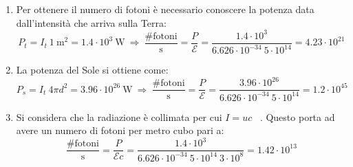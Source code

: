 \documentclass[12pt,twoside,a4]{article}
\begin{document}
\begin{solution}
\begin{enumerate}[label=(\textit{\roman*})]
	\item Per ottenere il numero di fotoni è necessario conoscere la potenza data dall'intensità che arriva sulla Terra: \begin{equation*}
    P_t = I_t \ 1 \ \mathrm{m}^2 = 1.4 \cdot 10^3 \ \mathrm{W}  \  \Rightarrow  \  \frac{\mathrm{\#fotoni}}{\mathrm{s}} = \frac{P}{\mathcal{E}} = \frac{1.4 \cdot 10^3}{6.626 \cdot 10^{-34} \ 5 \cdot 10^{14}} = 4.23 \cdot 10^{21} 
\end{equation*}

\item La potenza del Sole si ottiene come: \begin{equation*}
    P_s = I_t \ 4\pi d^2 = 3.96 \cdot 10^{26} \ \mathrm{W}  \  \Rightarrow  \  \frac{\mathrm{\#fotoni}}{\mathrm{s}} = \frac{P}{\mathcal{E}} = \frac{3.96 \cdot 10^{26}}{6.626 \cdot 10^{-34} \ 5 \cdot 10^{14}} = 1.2 \cdot 10^{45} 
\end{equation*}

\item Si considera che la radiazione è collimata per cui $I = u c $ \ . Questo porta ad avere un numero di fotoni per metro cubo pari a: \begin{equation*}
 \frac{\mathrm{\#fotoni}}{\mathrm{s}} = \frac{P}{\mathcal{E} c} = \frac{1.4 \cdot 10^{3}}{6.626 \cdot 10^{-34} \ 5 \cdot 10^{14} \ 3 \cdot 10^{8}} = 1.42 \cdot 10^{13}   
\end{equation*}
\end{enumerate}
\end{solution}
\end{document}
